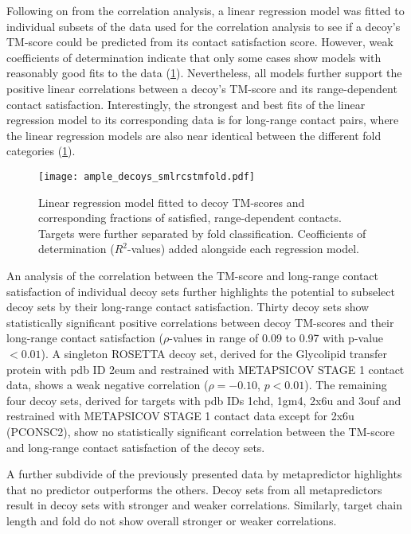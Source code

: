 Following on from the correlation analysis, a linear regression model was fitted to individual subsets of the data used for the correlation analysis to see if a decoy's TM-score could be predicted from its contact satisfaction score. However, weak coefficients of determination indicate that only some cases show models with reasonably good fits to the data (\cref{fig:ample_decoys_smlrcstmfold}). Nevertheless, all models further support the positive linear correlations between a decoy's TM-score and its range-dependent contact satisfaction. Interestingly, the strongest and best fits of the linear regression model to its corresponding data is for long-range contact pairs, where the linear regression models are also near identical between the different fold categories (\cref{fig:ample_decoys_smlrcstmfold}).

\begin{figure}[H]
	\centering
	\texttt{[image: ample\_decoys\_smlrcstmfold.pdf]}
        \caption[Linear regression model between decoy TM-score and contact satisfaction]{Linear regression model fitted to decoy TM-scores and corresponding fractions of satisfied, range-dependent contacts. Targets were further separated by fold classification. Ceofficients of determination ($R^2$-values) added alongside each regression model.}
	\label{fig:ample_decoys_smlrcstmfold}
\end{figure}

An analysis of the correlation between the TM-score and long-range contact satisfaction of individual decoy sets further highlights the potential to subselect decoy sets by their long-range contact satisfaction. Thirty decoy sets show statistically significant positive correlations between decoy TM-scores and their long-range contact satisfaction ($\rho$-values in range of 0.09 to 0.97 with p-value $<0.01$). A singleton ROSETTA decoy set, derived for the Glycolipid transfer protein with \gls{pdb} ID 2eum and restrained with METAPSICOV STAGE 1 contact data, shows a weak negative correlation ($\rho=-0.10$, $p<0.01$). The remaining four decoy sets, derived for targets with \gls{pdb} IDs 1chd, 1gm4, 2x6u and 3ouf and restrained with METAPSICOV STAGE 1 contact data except for 2x6u (PCONSC2), show no statistically significant correlation between the TM-score and long-range contact satisfaction of the decoy sets. 

A further subdivide of the previously presented data by metapredictor highlights that no predictor outperforms the others. Decoy sets from all metapredictors result in decoy sets with stronger and weaker correlations. Similarly, target chain length and fold do not show overall stronger or weaker correlations. 

